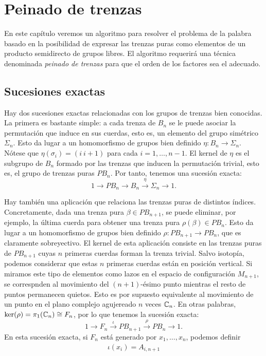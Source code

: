 \documentclass[TFG.tex]{subfiles}
\begin{document}
\chapter{Peinado de trenzas}

En este capítulo veremos un algoritmo para resolver el problema de la palabra basado en la posibilidad de expresar las trenzas puras como elementos de un producto semidirecto de grupos libres. El algoritmo requerirá una técnica denominada \emph{peinado de trenzas} para que el orden de los factores sea el adecuado.

\section{Sucesiones exactas}
Hay dos sucesiones exactas relacionadas con los grupos de trenzas bien conocidas. La primera es bastante simple: a cada trenza de $B_n$ se le puede asociar la permutación que induce en sus cuerdas, esto es, un elemento del grupo simétrico $\Sigma_n$. Esto da lugar a un homomorfismo de grupos bien definido $\eta: B_n\to \Sigma_n$. Nótese que $\eta(\sigma_i)=(i\ i+1)$ para cada $i=1,\dots, n-1$. El kernel de $\eta$ es el subgrupo de $B_n$ formado por las trenzas que inducen la permutación trivial, esto es, el grupo de trenzas puras $PB_n$. Por tanto, tenemos una sucesión exacta:
\begin{equation}\label{extension}
1\to PB_n\to B_n\overset{\eta}{\to}\Sigma_n\to 1.
\end{equation}

Hay también una aplicación que relaciona las trenzas puras de distintos índices. Concretamente, dada una trenza pura $\beta\in PB_{n+1}$, se puede eliminar, por ejemplo, la última cuerda para obtener una trenza pura $\rho(\beta)\in PB_n$. Esto da lugar a un homomorfismo de grupos bien definido $\rho: PB_{n+1}\to PB_n$, que es claramente sobreyectivo. El kernel de esta aplicación consiste en las trenzas puras de $PB_{n+1}$ cuyas $n$ primeras cuerdas forman la trenza trivial. Salvo isotopía, podemos considerar que estas $n$ primeras cuerdas están en posición vertical. Si miramos este tipo de elementos como lazos en el espacio de configuración $M_{n+1}$, se correspnden al movimiento del $(n+1)$-ésimo punto mientras el resto de puntos permanecen quietos. Esto es por supuesto equivalente al movimiento de un punto en el plano complejo agujereado $n$ veces $\mathbb{C}_n$. En otras palabras, $\ker(\rho)=\pi_1(\mathbb{C}_n)\cong F_n$, por lo que tenemos la sucesión exacta:
\begin{equation}\label{pure}
1\to F_n\overset{\iota}{\to} PB_{n+1}\overset{\rho}{\to} PB_n\to 1.
\end{equation} 
En esta sucesión exacta, si $F_n$ está generado por $x_1,\dots, x_n$, podemos definir
\begin{gather*}
\iota(x_i)=A_{i,n+1}
\end{gather*}
\end{document}
